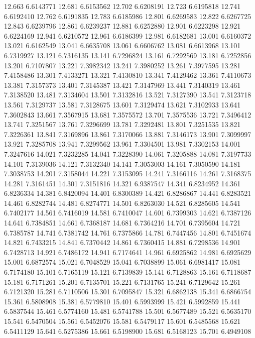 12.663 6.6143771
12.681 6.6153562
12.702 6.6208191
12.723 6.6195818
12.741 6.6192410
12.762 6.6191835
12.783 6.6185986
12.801 6.6269583
12.822 6.6267725
12.843 6.6239796
12.861 6.6239237
12.881 6.6252880
12.901 6.6223298
12.921 6.6224169
12.941 6.6210572
12.961 6.6186399
12.981 6.6182681
13.001 6.6160372
13.021 6.6162549
13.041 6.6635708
13.061 6.6606762
13.081 6.6613968
13.101 6.7319927
13.121 6.7316135
13.141 6.7296824
13.161 6.7292569
13.181 6.7252856
13.201 6.7107807
13.221 7.3982342
13.241 7.3980252
13.261 7.3977595
13.281 7.4158486
13.301 7.4133271
13.321 7.4130810
13.341 7.4129462
13.361 7.4110673
13.381 7.3157373
13.401 7.3145387
13.421 7.3147969
13.441 7.3140319
13.461 7.3138520
13.481 7.3134604
13.501 7.3132816
13.521 7.3127390
13.541 7.3123718
13.561 7.3129737
13.581 7.3128675
13.601 7.3129474
13.621 7.3102933
13.641 7.3602843
13.661 7.3567915
13.681 7.3575572
13.701 7.3575536
13.721 7.3496412
13.741 7.3251567
13.761 7.3296699
13.781 7.3292481
13.801 7.3251535
13.821 7.3226361
13.841 7.3169896
13.861 7.3170066
13.881 7.3146173
13.901 7.3099997
13.921 7.3285708
13.941 7.3299562
13.961 7.3304501
13.981 7.3302153
14.001 7.3247616
14.021 7.3232285
14.041 7.3228390
14.061 7.3205888
14.081 7.3197733
14.101 7.3139036
14.121 7.3132340
14.141 7.3053003
14.161 7.3050590
14.181 7.3038753
14.201 7.3158044
14.221 7.3153095
14.241 7.3166116
14.261 7.3168375
14.281 7.3161451
14.301 7.3151816
14.321 6.9387547
14.341 6.8234952
14.361 6.8236334
14.381 6.8420094
14.401 6.8300389
14.421 6.8286867
14.441 6.8283521
14.461 6.8282744
14.481 6.8274771
14.501 6.8263030
14.521 6.8285605
14.541 6.7402177
14.561 6.7416019
14.581 6.7410047
14.601 6.7399303
14.621 6.7387126
14.641 6.7384851
14.661 6.7368187
14.681 6.7364216
14.701 6.7395604
14.721 6.7385787
14.741 6.7381742
14.761 6.7375866
14.781 6.7447456
14.801 6.7451674
14.821 6.7433215
14.841 6.7370442
14.861 6.7360415
14.881 6.7298536
14.901 6.7428713
14.921 6.7486172
14.941 6.7174641
14.961 6.6925862
14.981 6.6925629
15.001 6.6872574
15.021 6.7048529
15.041 6.7038899
15.061 6.6981417
15.081 6.7174180
15.101 6.7165119
15.121 6.7139839
15.141 6.7128863
15.161 6.7118687
15.181 6.7171261
15.201 6.7135701
15.221 6.7131765
15.241 6.7129642
15.261 6.7121320
15.281 6.7110506
15.301 6.7095847
15.321 6.6862138
15.341 6.6866754
15.361 6.5808908
15.381 6.5779810
15.401 6.5993999
15.421 6.5992859
15.441 6.5837544
15.461 6.5774160
15.481 6.5741788
15.501 6.5677489
15.521 6.5635170
15.541 6.5470504
15.561 6.5452076
15.581 6.5479117
15.601 6.5485568
15.621 6.5411129
15.641 6.5275386
15.661 6.5198900
15.681 6.5168123
15.701 6.4949108
